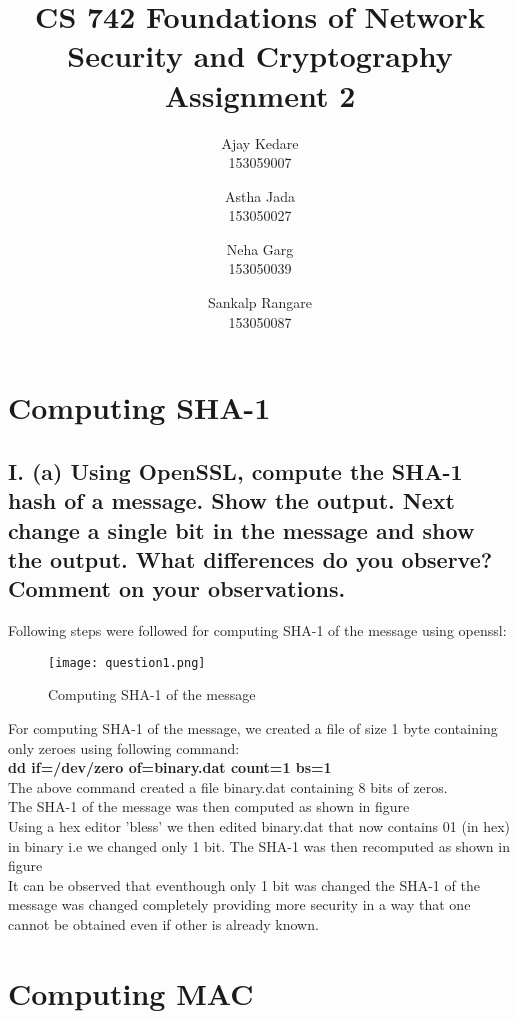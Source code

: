 \documentclass{article}
\title{CS 742 Foundations of Network Security and Cryptography \\ Assignment 2}
\author{
  Ajay Kedare \\
  153059007
  \and
  Astha Jada \\
  153050027
  \and
  Neha Garg \\
  153050039
  \and
  Sankalp Rangare \\
  153050087
}
\begin{document}
\maketitle
\clearpage

\section*{Computing SHA-1}
\subsection*{I. (a) Using OpenSSL, compute the SHA-1 hash of a message. Show the output.
Next change a single bit in the message and show the output. What differences
do you observe? Comment on your observations.}

Following steps were followed for computing SHA-1 of the message using openssl:\\

	\begin{figure}[htb]
	    \begin{center}
		\texttt{[image: question1.png]}
		\caption{Computing SHA-1 of the message}
	    \end{center}
	\end{figure}

\noindent For computing SHA-1 of the message, we created a file of size 1 byte containing only zeroes using following command:\\
\textbf{ dd if=/dev/zero of=binary.dat count=1 bs=1}\\

\noindent The above command created a file binary.dat containing 8 bits of zeros.\\

\noindent The SHA-1 of the message was then computed as shown in figure\\

\noindent Using a hex editor 'bless' we then edited binary.dat that now contains 01 (in hex) in binary i.e we changed only 1 bit. The SHA-1 was then recomputed as shown in figure\\

\noindent It can be observed that eventhough only 1 bit was changed the SHA-1 of the message was changed completely providing more security in a way that one cannot be obtained even if other is already known.
 
 


\section*{Computing MAC}
\end{document}
